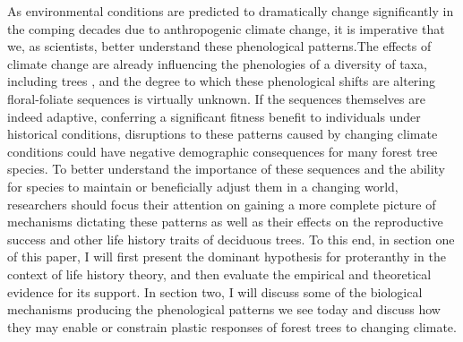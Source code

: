 \documentclass{article}\usepackage[]{graphicx}\usepackage[]{color}
\begin{document}
\par As environmental conditions are predicted to dramatically change significantly in the comping decades due to anthropogenic climate change, it is imperative that we, as scientists, better understand these phenological patterns.The effects of climate change are already influencing the phenologies of a diversity of taxa, including trees \citep{Menzel2006}, and the degree to which these phenological shifts are altering floral-foliate sequences is virtually unknown. If the sequences themselves are indeed adaptive, conferring a significant fitness benefit to individuals under historical conditions, disruptions to these patterns caused by changing climate conditions could have negative demographic consequences for many forest tree species. To better understand the importance of these sequences and the ability for species to maintain or beneficially adjust them in a changing world, researchers should focus their attention on gaining a more complete picture of mechanisms dictating these patterns as well as their effects on the reproductive success and other life history traits of deciduous trees. To this end, in section one of this paper, I will first present the dominant hypothesis for proteranthy in the context of life history theory, and then evaluate the empirical and theoretical evidence for its support. In section two, I will discuss some of the biological mechanisms producing the phenological patterns we see today and discuss how they may enable or constrain plastic responses of forest trees to changing climate.
\end{document}
